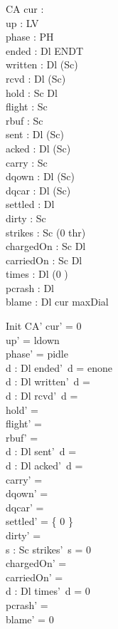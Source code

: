 \documentclass[a4paper,10pt,fleqn]{article}
\begin{document}
\begin{schema}{CA}
  cur : \nat \\
  up : LV \\
  phase : PH \\
  ended : Dl \fun ENDT \\
  written : Dl \fun (\power Sc) \\
  rcvd : Dl \fun (\power Sc) \\
  hold : Sc \pfun Dl \\
  flight : \power Sc \\
  rbuf : \power Sc \\
  sent : Dl \fun (\power Sc) \\
  acked : Dl \fun (\power Sc) \\
  carry : \power Sc \\
  dqown : Dl \pfun (\power Sc) \\
  dqcar : Dl \pfun (\power Sc) \\
  settled : \power Dl \\
  dirty : \power Sc \\
  strikes : Sc \fun (0 \upto thr) \\
  chargedOn : Sc \rel Dl \\
  carriedOn : Sc \rel Dl \\
  times : Dl \fun (0 ) \\
  pcrash : \power Dl \\
  blame : Dl
\where
  cur \leq maxDial
\end{schema}

\begin{schema}{Init}
  CA'
\where
  cur' = 0 \\
  up' = ldown \\
  phase' = pidle \\
  \forall d : Dl \spot ended'~d = enone \\
  \forall d : Dl \spot written'~d = \emptyset \\
  \forall d : Dl \spot rcvd'~d = \emptyset \\
  hold' = \emptyset \\
  flight' = \emptyset \\
  rbuf' = \emptyset \\
  \forall d : Dl \spot sent'~d = \emptyset \\
  \forall d : Dl \spot acked'~d = \emptyset \\
  carry' = \emptyset \\
  dqown' = \emptyset \\
  dqcar' = \emptyset \\
  settled' = \{ 0 \} \\
  dirty' = \emptyset \\
  \forall s : Sc \spot strikes'~s = 0 \\
  chargedOn' = \emptyset \\
  carriedOn' = \emptyset \\
  \forall d : Dl \spot times'~d = 0 \\
  pcrash' = \emptyset \\
  blame' = 0
\end{schema}
\end{document}
